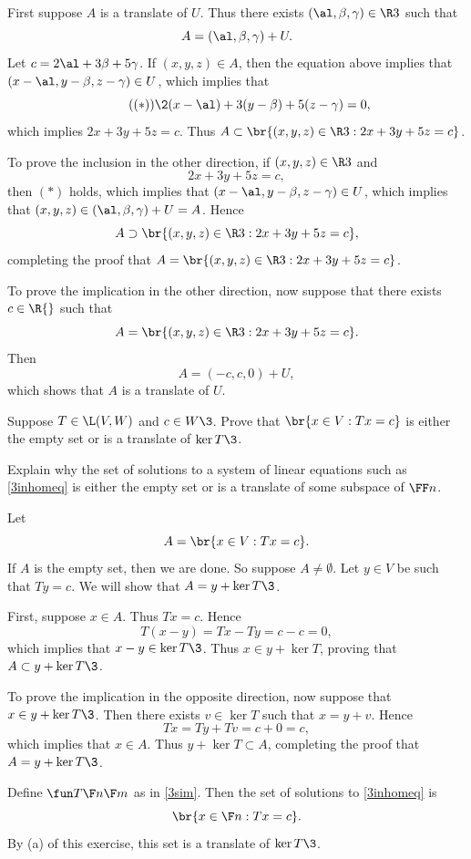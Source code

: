\begin{Solution}
First suppose $A$ is a translate of $U$. Thus there exists $(\al, \beta, \gamma) \in \R3$ such that
\[
A = (\al, \beta, \gamma) + U.
\]
Let $c = 2 \al + 3\beta + 5 \gamma$. If $(x, y, z) \in A$, then the equation above implies that $(x-\al, y - \beta, z - \gamma) \in U$, which implies that
\[ \tag{$(*)$}
\2(x- \al) + 3(y-\beta) + 5 (z - \gamma) = 0,
\]
which implies $2x + 3y + 5z = c$. Thus $A \subset  \br{ (x, y, z) \in \R3: 2x + 3y + 5z= c}$.

To prove the inclusion in the other direction, if $(x, y, z) \in \R3$ and
\[
2x + 3y + 5z= c,
\]
then $(*)$ holds, which implies that
$(x - \al, y - \beta, z - \gamma) \in U$, which implies that $(x,y,z) \in (\al, \beta, \gamma) + U = A$. Hence
\[
A \supset  \br{ (x, y, z) \in \R3: 2x + 3y + 5z= c},
\]
completing the proof that $A = \br{ (x, y, z) \in \R3: 2x + 3y + 5z= c}$.

To prove the implication in the other direction, now suppose that there exists $c \in \R{}$ such that
\[
A = \br{ (x, y, z) \in \R3: 2x + 3y + 5z= c}.
\]
Then
\[
A = (-c, c, 0) + U,
\]
which shows that $A$ is a translate of $U$.
\end{Solution}

\exercise
\begin{SUBtheorem}
\item
Suppose $T \in \L(V, W)$ and $c \in W\3$. Prove that $\br{x \in V : Tx = c}$ is either the empty set or is a translate of
$\ker T\3$.

\item
Explain why the set of solutions to a system of linear equations such as \ref{3inhomeq} is either the empty set or is a translate of some subspace of $\FF n$.
\end{SUBtheorem}

\begin{Solution}
\begin{subtheorem}
\item
Let
\[
A = \br{x \in V : Tx = c}.
\]
If $A$ is the empty set, then we are done. So suppose $A \ne \emptyset$. Let $y \in V$ be such that $Ty = c$. We will show that $A = y + \ker T\3$.

First, suppose $x \in A$. Thus $Tx = c$. Hence
\[
T(x - y) = Tx - Ty = c - c = 0,
\]
which implies that $x - y \in \ker T\3$. Thus $x \in y + \ker T$, proving that $A \subset y + \ker T\3$.

To prove the implication in the opposite direction, now suppose that $x \in y + \ker T\3$. Then there exists $v \in \ker T$ such that $x = y + v$. Hence
\[
Tx = Ty + Tv = c + 0 = c,
\]
which implies that $x \in A$. Thus $y + \ker T \subset A$, completing the proof that $A = y + \ker T\3$.

\item
Define $\fun T {\F n} {\F m}$ as in \ref{3sim}. Then the set of solutions to \ref{3inhomeq} is
\[
\br{ x \in \F n: Tx = c }.
\]
By (a) of this exercise, this set is a translate of $\ker T\3$.
\end{subtheorem}
\end{Solution}

